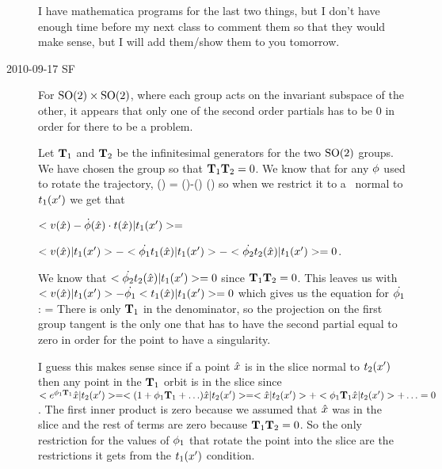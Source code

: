 \begin{description}
\begin{enumerate}
\end{enumerate}

I have mathematica programs for the last two things, but I don't have enough time before my next class to comment them so that they would make sense, but I will add them/show them to you tomorrow.

\item[2010-09-17 SF]
For $\textrm{SO}(2) \times \textrm{SO}(2)$, where each group acts on the invariant subspace of the other, it appears that only one of the second order partials has to be 0 in order for there to be a problem.

Let $\mathbf{T}_1$ and $\mathbf{T}_2$ be the infinitesimal generators for the two $\textrm{SO}(2)$ groups. We have chosen the group so that $\mathbf{T}_1 \mathbf{T}_2=0$.
We know that for any ${\bf \phi}$ used to rotate the trajectory,
\beq
\velRed(\sspRed) = \vel(\sspRed)-\dot{\gSpace}(\sspRed) \cdot \groupTan(\sspRed)
\eeq
so when we restrict it to a \slice\ normal to $t_1(x')$ we get that

$<v(\hat{x})-\dot{{\bf \phi}}(\hat{x}) \cdot t(\hat{x})|t_1(x')>=$

$<v(\hat{x})|t_1(x')>-<\dot{{\bf \phi}_1} t_1(\hat{x})|t_1(x')>-<\dot{{\bf \phi}_2} t_2(\hat{x})|t_1(x')>=0$.

We know that
$<\dot{{\bf \phi}_2} t_2(\hat{x})|t_1(x')>=0$ since $\mathbf{T}_1 \mathbf{T}_2=0$.
This leaves us with $<v(\hat{x})|t_1(x')>-\dot{{\bf \phi}_1}<t_1(\hat{x})|t_1(x')>=0$ which gives us the equation for $\dot{{\bf \phi}_1}$:
\beq
{}=
\eeq
There is only $\mathbf{T}_1$ in the denominator, so the projection on the first group tangent is the only one that has to have the second partial equal to zero in order for the point to have a singularity.

I guess this makes sense since if a point $\hat{x}$ is in the slice normal to $t_2(x')$ then any point in the $\mathbf{T}_1$ orbit is in the slice since $<e^{{\bf \phi}_1 \mathbf{T}_1}\hat{x}|t_2(x')>=<(1+{\bf \phi}_1 \mathbf{T}_1+\ldots)\hat{x}|t_2(x')>=<\hat{x}|t_2(x')>+<{\bf \phi}_1 \mathbf{T}_1 \hat{x}|t_2(x')>+\ldots=0$. The first inner product is zero because we assumed that $\hat{x}$ was in the slice and the rest of terms are zero because $\mathbf{T}_1 \mathbf{T}_2=0$. So the only restriction for the values of ${\bf \phi}_1$ that rotate the point into the slice are the restrictions it gets from the $t_1(x')$ condition.


\end{description}
